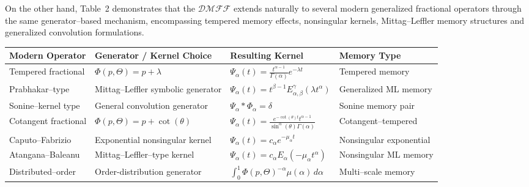 \documentclass[11pt]{article}
\numberwithin{equation}{section}
\begin{document}
\noindent
On the other hand, Table~2 demonstrates that the  $\mathcal{DMFF}$ extends naturally
to several modern generalized fractional operators through the same
generator--based mechanism, encompassing tempered memory effects,
nonsingular kernels, Mittag--Leffler memory structures and generalized
convolution formulations.


\begin{table}[H]
\centering
\scriptsize
\renewcommand{\arraystretch}{1.2}

\begin{tabular}{|p{3cm}|p{3.2cm}|p{4.5cm}|p{2.3cm}|}
\hline
\textbf{Modern Operator} &
\textbf{Generator / Kernel Choice} &
\textbf{Resulting Kernel} &
\textbf{Memory Type}
\\
\hline

Tempered fractional \cite{Sabzikar2015} &
$\Phi(p,\Theta)=p+\lambda$ &
$\displaystyle
\Psi_\alpha(t)=
\frac{t^{\alpha-1}}{\Gamma(\alpha)}
e^{-\lambda t}
$ &
Tempered memory
\\
\hline

Prabhakar--type \cite{Prabhakar1971}  &
Mittag--Leffler symbolic generator &
$\displaystyle
\Psi_\alpha(t)
=
t^{\beta-1}
E_{\alpha,\beta}^{\gamma}(\lambda t^\alpha)
$ &
Generalized ML memory
\\
\hline

Sonine--kernel type \cite{Kochubei2011} &
General convolution generator &
$\displaystyle
\Psi_\alpha * \Phi_\alpha=\delta
$ &
Sonine memory pair
\\
\hline

Cotangent fractional \cite{Lakhalfa2021} &
$\Phi(p,\Theta)=p+\cot(\theta)$ &
$\displaystyle
\Psi_\alpha(t)=
\frac{
e^{-\cot(\theta)t}
t^{\alpha-1}
}{
\sin^\alpha(\theta)\Gamma(\alpha)
}
$ &
Cotangent--tempered
\\
\hline

Caputo--Fabrizio \cite{CaputoFabrizio2015} &
Exponential nonsingular kernel &
$\displaystyle
\Psi_\alpha(t)=
c_\alpha e^{-\mu_\alpha t}
$ &
Nonsingular exponential
\\
\hline

Atangana--Baleanu \cite{AtanganaBaleanu2016} &
Mittag--Leffler--type kernel &
$\displaystyle
\Psi_\alpha(t)=
c_\alpha
E_\alpha(-\mu_\alpha t^\alpha)
$ &
Nonsingular ML memory
\\
\hline

Distributed--order \cite{Chechkin2002} &
Order-distribution generator &
$\displaystyle
\int_0^1
\Phi(p,\Theta)^{-\alpha}
\mu(\alpha)\,d\alpha
$ &
Multi--scale memory
\\
\hline


\end{tabular}
\end{table}
\end{document}
